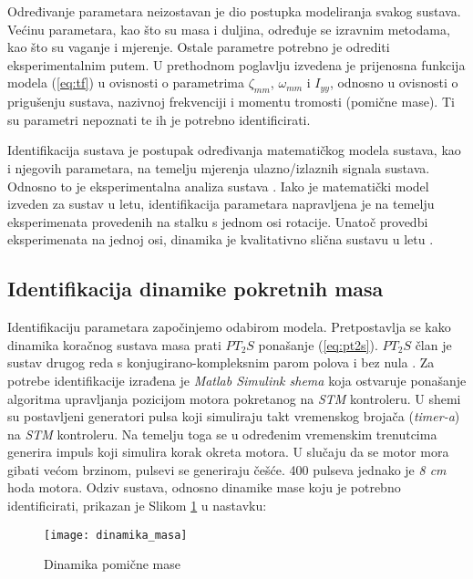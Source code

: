 \documentclass[11pt,a4paper]{article}
\begin{document}
Određivanje parametara neizostavan je dio postupka modeliranja svakog sustava. Većinu parametara, kao što su masa i duljina, određuje se izravnim metodama, kao što su vaganje i mjerenje. Ostale parametre potrebno je odrediti eksperimentalnim putem. U prethodnom poglavlju izvedena je prijenosna funkcija modela (\ref{eq:tf}) u ovisnosti o parametrima $\zeta_{mm}$, $\omega_{mm}$ i $I_{yy}$, odnosno u ovisnosti o prigušenju sustava, nazivnoj frekvenciji i momentu tromosti (pomične mase). Ti su parametri nepoznati te ih je potrebno identificirati. 

\medskip

Identifikacija sustava je postupak određivanja matematičkog modela sustava, kao i njegovih parametara, na temelju mjerenja ulazno/izlaznih signala sustava. Odnosno to je eksperimentalna analiza sustava \cite{te}. Iako je matematički model izveden za sustav u letu, identifikacija parametara napravljena je na temelju eksperimenata provedenih na stalku s jednom osi rotacije. Unatoč provedbi eksperimenata na jednoj osi, dinamika je kvalitativno slična sustavu u letu \cite{haus3}.

\subsection{Identifikacija dinamike pokretnih masa}

Identifikaciju parametara započinjemo odabirom modela. Pretpostavlja se kako dinamika koračnog sustava masa prati $PT_{2}S$ ponašanje (\ref{eq:pt2s}). $PT_{2}S$ član je sustav drugog reda s konjugirano-kompleksnim parom polova i bez nula \cite{aupr}. Za potrebe identifikacije izrađena je \textit{Matlab Simulink shema} koja ostvaruje ponašanje algoritma upravljanja pozicijom motora pokretanog na \textit{STM} kontroleru. U shemi su postavljeni generatori pulsa koji simuliraju takt vremenskog brojača (\textit{timer-a}) na \textit{STM} kontroleru. Na temelju toga se u određenim vremenskim trenutcima generira impuls koji simulira korak okreta motora. U slučaju da se motor mora gibati većom brzinom, pulsevi se generiraju češće. 400 pulseva jednako je \textit{8 cm} hoda motora. Odziv sustava, odnosno dinamike mase koju je potrebno identificirati, prikazan je Slikom \ref{fig:masa} u nastavku:

\begin{figure}[H]
	\centering
	\texttt{[image: dinamika\_masa]}
	\caption{Dinamika pomične mase}
	\label{fig:masa}
\end{figure}
\end{document}
